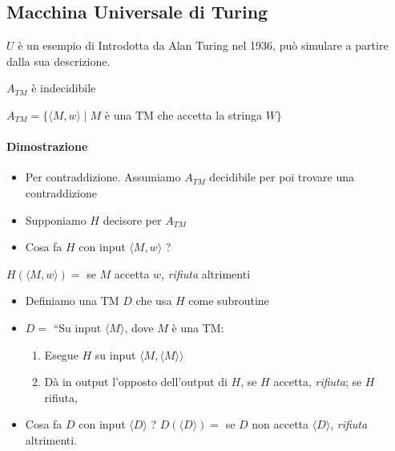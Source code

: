 \subsection{Macchina Universale di Turing}
$U$ è un esempio di  
Introdotta da Alan Turing nel 1936, può simulare  a partire dalla sua descrizione. 

\begin{theorem}
	$A_{TM}$ è indecidibile
\end{theorem}
$A_{TM}= \{\langle M,w\rangle\mid M$ è una TM che accetta la stringa $W\}$ 
\paragraph{Dimostrazione}
\begin{itemize}
	\item Per contraddizione. Assumiamo $A_{TM}$ decidibile per poi trovare una contraddizione
	\item Supponiamo $H$ decisore per $A_{TM}$ 
	\item Cosa fa $H$ con input $\langle M,w\rangle$ ?
\end{itemize}
$H(\langle M,w\rangle)=$  se $M$ accetta $w$, \textit{rifiuta} altrimenti
\begin{itemize}
\item Definiamo una TM $D$  che usa $H$ come subroutine 
\item $D=$ ``Su input $\langle M\rangle$, dove $M$ è una TM: 
	\begin{enumerate}
		\item Esegue $H$ su input $\langle M,\langle M\rangle\rangle$
		\item  Dà in output l'opposto dell'output di $H$, se $H$ accetta, \textit{rifiuta}; se $H$ rifiuta,  
	\end{enumerate}
\item Cosa fa $D$ con input $\langle D\rangle$ ? 
$D(\langle D\rangle)=$  se $D$ non accetta $\langle D\rangle$, \textit{rifiuta} altrimenti.
\end{itemize}

